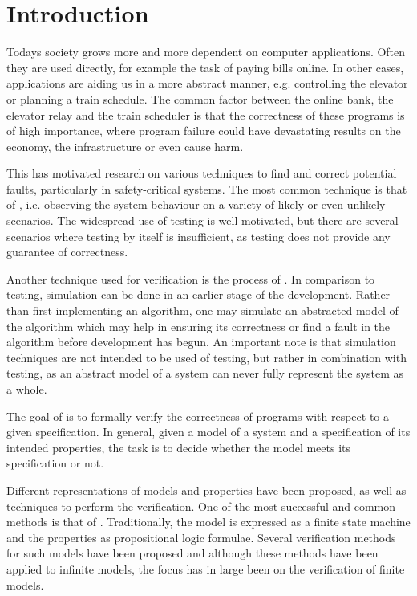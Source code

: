 \newpage
\section{Introduction}
Todays society grows more and more dependent on computer applications. Often they are used directly, for example the task of paying bills online. In other cases, applications are aiding us in a more abstract manner, e.g. controlling the elevator or planning a train schedule. The common factor between the online bank, the elevator relay and the train scheduler is that the correctness of these programs is of high importance, where program failure could have devastating results on the economy, the infrastructure or even cause harm.

This has motivated research on various techniques to find and correct potential faults, particularly in safety-critical systems. The most common technique is that of , i.e. observing the system behaviour on a variety of likely or even unlikely scenarios. The widespread use of testing is well-motivated, but there are several scenarios where testing by itself is insufficient, as testing does not provide any guarantee of correctness.

Another technique used for verification is the process of . In comparison to testing, simulation can be done in an earlier stage of the development. Rather than first implementing an algorithm, one may simulate an abstracted model of the algorithm which may help in ensuring its correctness or find a fault in the algorithm before development has begun. An important note is that simulation techniques are not intended to be used  of testing, but rather in combination with testing, as an abstract model of a system can never fully represent the system as a whole.

The goal of  is to formally verify the correctness of programs with respect to a given specification. In general, given a model of a system and a specification of its intended properties, the task is to decide whether the model meets its specification or not.

Different representations of models and properties have been proposed, as well as techniques to perform the verification. One of the most successful and common methods is that of . Traditionally, the model is expressed as a finite state machine and the properties as propositional logic formulae. Several verification methods for such models have been proposed\cite{mcmillan1993symbolic} and although these methods have been applied to infinite models\cite{705644}, the focus has in large been on the verification of finite models.

